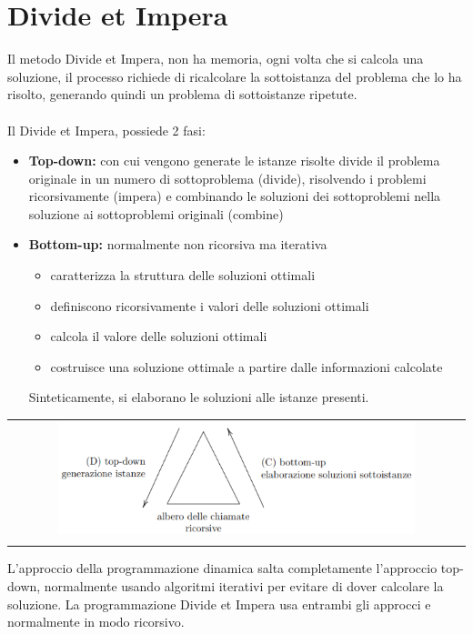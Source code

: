 \section{Divide et Impera}
Il metodo Divide et Impera, non ha memoria, ogni volta che si calcola una soluzione, il processo richiede di ricalcolare la sottoistanza del problema che lo ha risolto, generando quindi un problema di sottoistanze ripetute. \\~\\

Il Divide et Impera, possiede 2 fasi:
\begin{itemize}
    \item \textbf{Top-down:} con cui vengono generate le istanze risolte divide il problema originale in un numero di sottoproblema (divide), risolvendo i problemi ricorsivamente (impera) e combinando le soluzioni dei sottoproblemi nella soluzione ai sottoproblemi originali (combine)
    \item \textbf{Bottom-up:} normalmente non ricorsiva ma iterativa
    \begin{itemize}
        \item caratterizza la struttura delle soluzioni ottimali
        \item definiscono ricorsivamente i valori delle soluzioni ottimali
        \item calcola il valore delle soluzioni ottimali
        \item costruisce una soluzione ottimale a partire dalle informazioni calcolate
    \end{itemize}
    Sinteticamente, si elaborano le soluzioni alle istanze presenti.
\end{itemize}
\begin{center}
    \begin{tabular}{c}
        \\ \includegraphics[width=0.8\textwidth]{image/T-D_B-U.png} \\ \\
    \end{tabular}
\end{center}
L'approccio della programmazione dinamica salta completamente l'approccio top-down, normalmente usando algoritmi iterativi per evitare di dover calcolare la soluzione. La programmazione Divide et Impera usa entrambi gli approcci e normalmente in modo ricorsivo.


